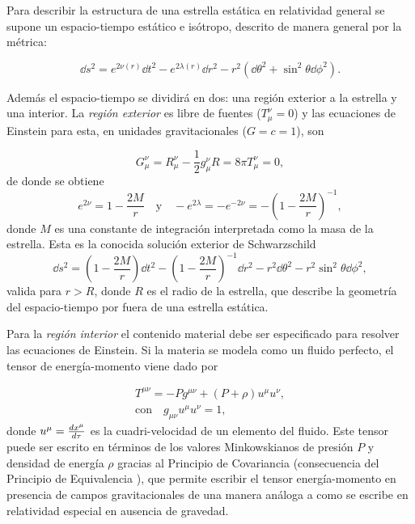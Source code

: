 Para describir la estructura de una estrella estática en relatividad general se supone un espacio-tiempo estático e isótropo, descrito de manera general por la métrica:

\begin{equation}
\dd{s}^ { 2 } = e ^ { 2 \nu ( r ) } \dd{ t} ^ { 2 } - e ^ { 2 \lambda ( r ) } \dd{ r} ^ { 2 } - r ^ { 2 } \left( \dd{ \theta} ^ { 2 } + \sin ^ { 2 }  \theta  \dd{ \phi} ^ { 2 } \right) .   
\end{equation}

Además el espacio-tiempo se dividirá en dos: una región exterior a la estrella y una interior. 
La \textit{región exterior} es libre de fuentes ($T _ { \mu } ^ { \nu }=0$) y las ecuaciones de Einstein para esta, en unidades gravitacionales ($G=c=1$), son 

\begin{equation}
    G _ { \mu } ^ { \nu } = R _ { \mu } ^ { \nu } - \frac { 1 } { 2 } g _ { \mu } ^ { \nu } R = 8 \pi T _ { \mu } ^ { \nu }=0,
\end{equation}
de donde se obtiene
\begin{equation}
    e ^ { 2 \nu } = 1 - \frac { 2 M } { r }\quad \text{y}\quad - e ^ { 2 \lambda } = - e ^ { - 2 \nu } = - \left( 1 - \frac { 2 M } { r } \right) ^ { - 1 },
\end{equation}
donde $M$ es una constante de integración interpretada como la masa de la estrella. Esta es la conocida solución exterior de Schwarzschild
\begin{equation}
    \dd{s} ^ { 2 } =  \left( 1 - \frac { 2 M } { r } \right) \dd{t} ^ { 2 } - \left( 1 - \frac { 2 M } { r } \right) ^ { - 1 } \dd{r} ^ { 2 }  - r ^ { 2 } \dd{\theta} ^ { 2 } - r ^ { 2 } \sin ^ { 2 } \theta \dd{\phi} ^ { 2 }, \label{schwarzs}
\end{equation}
valida para $r>R$, donde $R$ es el radio de la estrella, que describe la geometría del espacio-tiempo por fuera de una estrella estática.

Para la \textit{región interior} el contenido material debe ser especificado para resolver las ecuaciones de Einstein. Si la materia se modela como un fluido perfecto, el tensor de energía-momento viene dado por

\begin{equation}
    \begin{array} { c } { T ^ { \mu \nu } = - P g ^ { \mu \nu } + ( P + \rho ) u ^ { \mu } u ^ { \nu } }, \\ \text{con} \quad { g _ { \mu \nu } u ^ { \mu } u ^ { \nu } = 1 }, \end{array}
\end{equation}
donde $u^{\mu}=\dv{x^{\mu}}{\tau}$ es la cuadri-velocidad de un elemento del fluido. Este tensor puede ser escrito en términos de los valores Minkowskianos de presión $P$ y densidad de energía $\rho$ gracias al Principio de Covariancia (consecuencia del Principio de Equivalencia \cite{Weinberg1972}), que permite escribir el tensor energía-momento en presencia de campos gravitacionales de una manera análoga a como se escribe en relatividad especial en ausencia de gravedad.

